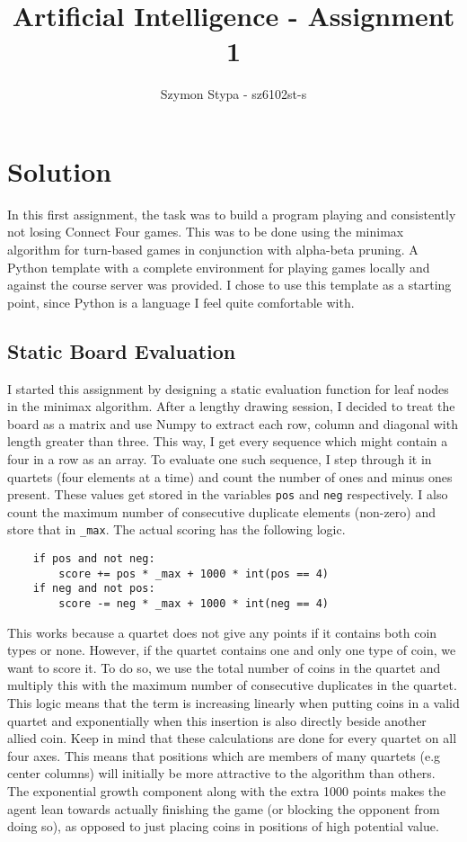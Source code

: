 \documentclass[a4paper]{article}
\title{Artificial Intelligence - Assignment 1}
\author{Szymon Stypa - sz6102st-s}
\newcommand{\code}[1]{\texttt{#1}}
\begin{document}
\maketitle

\section{Solution}
In this first assignment, the task was to build a program playing and consistently not losing Connect Four games. This was to be done using the  minimax algorithm for turn-based games in conjunction with alpha-beta pruning. A Python template with a complete environment for playing games locally and against the course server was provided. I chose to use this template as a starting point, since Python is a language I feel quite comfortable with.

\subsection{Static Board Evaluation}
I started this assignment by designing a static evaluation function for leaf nodes in the minimax algorithm. After a lengthy drawing session, I decided to treat the board as a matrix and use Numpy to extract each row, column and diagonal with length greater than three. This way, I get every sequence which might contain a four in a row as an array.
To evaluate one such sequence, I step through it in quartets (four elements at a time) and count the number of ones and minus ones present. These values get stored in the variables \code{pos} and \code{neg} respectively. I also count the maximum number of consecutive duplicate elements (non-zero) and store that in \code{\_max}. The actual scoring has the following logic.

\begin{verbatim}
    if pos and not neg:
        score += pos * _max + 1000 * int(pos == 4)
    if neg and not pos:
        score -= neg * _max + 1000 * int(neg == 4)
\end{verbatim}
This works because a quartet does not give any points if it contains both coin types or none. However, if the quartet contains one and only one type of coin, we want to score it. To do so, we use the total number of coins in the quartet and multiply this with the maximum number of consecutive duplicates in the quartet. This logic means that the term is increasing linearly when putting coins in a valid quartet and exponentially when this insertion is also directly beside another allied coin. Keep in mind that these calculations are done for every quartet on all four axes. This means that positions which are members of many quartets (e.g center columns) will initially be more attractive to the algorithm than others. The exponential growth component along with the extra 1000 points makes the agent lean towards actually finishing the game (or blocking the opponent from doing so), as opposed to just placing coins in positions of high potential value.
\end{document}
